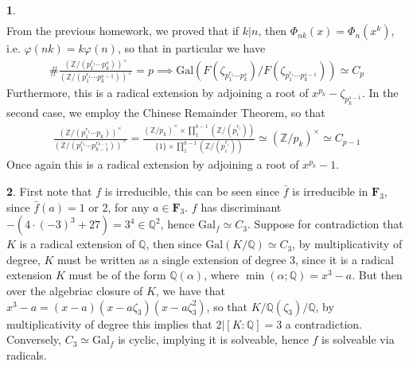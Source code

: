 \documentclass[11pt]{article}
\theoremstyle{definition}
\newtheorem{pb}{}
\newcommand{\set}[1]{\{#1\}}
\newcommand{\tor}{\text{ or }}
\newcommand{\gal}{\text{Gal}}
\begin{document}
\begin{pb}
\begin{align*}
        \end{align*}        
        From the previous homework, we proved that if \(k \vert n\), then \(\Phi_{nk}(x) = \Phi_n(x^k)\), i.e. \(\varphi(nk) = k\varphi(n)\), so that in particular we have
        \begin{align*}
            \# \frac{\left(\mathbb{Z}/(p_1^{r_1}\cdots p_k^{s})\right)^\times}{\left(\mathbb{Z}/(p_1^{r_1}\cdots p_k^{s - 1})\right)^\times} = p \implies \gal(F(\zeta_{p_1^{r_1}\cdots p_k^{s}})/F(\zeta_{p_1^{r_1}\cdots p_k^{s - 1}})) \simeq C_p
        \end{align*}
        Furthermore, this is a radical extension by adjoining a root of \(x^{p_k} - \zeta_{p_k^{s - 1}}\). In the second case, we employ the Chinese Remainder Theorem, so that
        \begin{align*}
            \frac{\left(\mathbb{Z}/(p_1^{r_1}\cdots p_k)\right)^\times}{\left(\mathbb{Z}/(p_1^{r_1}\cdots p_{k-1}^{r_{k-1}})\right)^\times} = \frac{\left(\mathbb{Z}/{p_k}\right)^\times \times\prod_1^{k-1}\left(\mathbb{Z}/(p_i^{r_i})\right)}{\set{1} \times \prod_1^{k-1}\left(\mathbb{Z}/(p_i^{r_i})\right)} \simeq \left(\mathbb{Z}/p_k\right)^\times \simeq C_{p-1}
        \end{align*}
        Once again this is a radical extension by adjoining a root of \(x^{p_k} - 1\).




    \end{pb}
    \begin{pb}
        First note that \(f\) is irreducible, this can be seen since \(\bar{f}\) is irreducible in \(\mathbf{F}_3\), since \(\bar{f}(a) = 1 \tor 2\), for any \(a \in \mathbf{F}_3\).
        \(f\) has discriminant \(-(4\cdot(-3)^3 + 27) = 3^4 \in \mathbb{Q}^2\), hence \(\gal_f \simeq C_3\). Suppose for contradiction that \(K\) is a radical extension of \(\mathbb{Q}\), then since \(\gal(K/\mathbb{Q}) \simeq C_3\), by multiplicativity of degree, \(K\) must be written as a single extension of degree 3, since it is a radical extension \(K\) must be of the form \(\mathbb{Q}(\alpha)\), where \(\min(\alpha;\mathbb{Q}) = x^3 - a\). But then over the algebriac closure of \(K\), we have that \(x^3 - a = (x - a)(x - a\zeta_3)(x-a\zeta_3^2)\), so that \(K/\mathbb{Q}(\zeta_3)/\mathbb{Q}\), by multiplicativity of degree this implies that \(2 \vert [K:\mathbb{Q}] = 3\) a contradiction. Conversely, \(C_3 \simeq \gal_f\) is cyclic, implying it is solveable, hence \(f\) is solveable via radicals.
    \end{pb}
\end{document}
